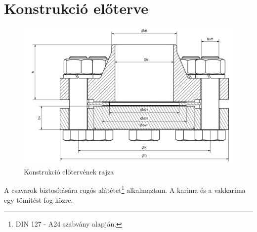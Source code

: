 \section{Konstrukció előterve}

\begin{figure}[hbt!]
	\centering
	\includegraphics[scale=.5]{./images/assembly-preplan.png}
	\caption{Konstrukció előtervének rajza}
\end{figure}

A csavarok biztosítására rugós alátétet\footnote{DIN 127 - A24 szabvány alapján.} alkalmaztam. A karima és a vakkarima egy tömítést fog közre.
